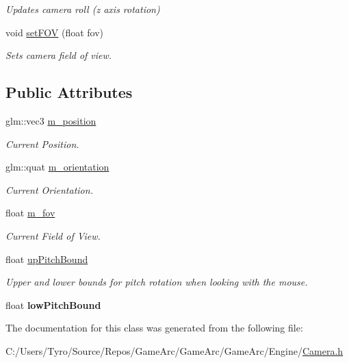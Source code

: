 \begin{DoxyCompactItemize}
\begin{DoxyCompactList}\small\item\em Updates camera roll (z axis rotation) \end{DoxyCompactList}\item 
\mbox{\label{class_camera_ade53ee61895c2143da3cec03d08ef3eb}} 
void \mbox{\hyperlink{class_camera_ade53ee61895c2143da3cec03d08ef3eb}{set\+F\+OV}} (float fov)
\begin{DoxyCompactList}\small\item\em Sets camera field of view. \end{DoxyCompactList}\end{DoxyCompactItemize}
\subsection*{Public Attributes}
\begin{DoxyCompactItemize}
\item 
\mbox{\label{class_camera_aa4d06d49524248f81823444fa2544da0}} 
glm\+::vec3 \mbox{\hyperlink{class_camera_aa4d06d49524248f81823444fa2544da0}{m\+\_\+position}}
\begin{DoxyCompactList}\small\item\em Current Position. \end{DoxyCompactList}\item 
\mbox{\label{class_camera_ac035d6cb4b4bae255d6d12f51137357e}} 
glm\+::quat \mbox{\hyperlink{class_camera_ac035d6cb4b4bae255d6d12f51137357e}{m\+\_\+orientation}}
\begin{DoxyCompactList}\small\item\em Current Orientation. \end{DoxyCompactList}\item 
\mbox{\label{class_camera_aa404a4e057fa16fb82ce8668d7a661b6}} 
float \mbox{\hyperlink{class_camera_aa404a4e057fa16fb82ce8668d7a661b6}{m\+\_\+fov}}
\begin{DoxyCompactList}\small\item\em Current Field of View. \end{DoxyCompactList}\item 
\mbox{\label{class_camera_a69da26cc38f7993b2605a8dd982aa0e4}} 
float \mbox{\hyperlink{class_camera_a69da26cc38f7993b2605a8dd982aa0e4}{up\+Pitch\+Bound}}
\begin{DoxyCompactList}\small\item\em Upper and lower bounds for pitch rotation when looking with the mouse. \end{DoxyCompactList}\item 
\mbox{\label{class_camera_a4f24e2b996dbf59fe1e2e51427dc49d3}} 
float {\bfseries low\+Pitch\+Bound}
\end{DoxyCompactItemize}


The documentation for this class was generated from the following file\+:\begin{DoxyCompactItemize}
\item 
C\+:/\+Users/\+Tyro/\+Source/\+Repos/\+Game\+Arc/\+Game\+Arc/\+Game\+Arc/\+Engine/\mbox{\hyperlink{_camera_8h}{Camera.\+h}}\end{DoxyCompactItemize}
